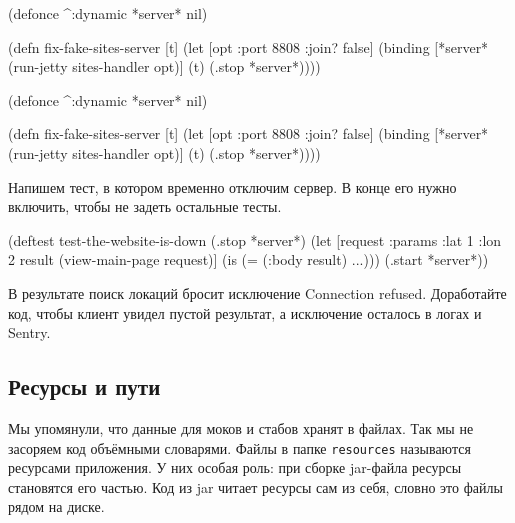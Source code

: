 
\ifnarrow

\begin{english}
  \begin{clojure}
(defonce ^:dynamic *server* nil)

(defn fix-fake-sites-server [t]
  (let [opt {:port 8808 :join? false}]
    (binding [*server*
              (run-jetty
                sites-handler opt)]
      (t)
      (.stop *server*))))
  \end{clojure}
\end{english}

\else

\begin{english}
  \begin{clojure}
(defonce ^:dynamic *server* nil)

(defn fix-fake-sites-server [t]
  (let [opt {:port 8808 :join? false}]
    (binding [*server*
              (run-jetty sites-handler opt)]
      (t)
      (.stop *server*))))
  \end{clojure}
\end{english}

\fi

Напишем тест, в котором временно отключим сервер. В конце его нужно включить,
чтобы не задеть остальные тесты.

\begin{english}
  \begin{clojure}
(deftest test-the-website-is-down
  (.stop *server*)
  (let [request {:params {:lat 1 :lon 2}}
        result (view-main-page request)]
    (is (= (:body result) {...})))
  (.start *server*))
  \end{clojure}
\end{english}

В результате поиск локаций бросит исключение Connection refused. Доработайте
код, чтобы клиент увидел пустой результат, а исключение осталось в логах и
Sentry.

\subsection{Ресурсы и пути}

\label{resources}


Мы упомянули, что данные для моков и стабов хранят в файлах. Так мы не засоряем
код объёмными словарями. Файлы в папке \verb|resources| называются ресурсами
приложения. У них особая роль: при сборке jar-файла ресурсы становятся его
частью. Код из jar читает ресурсы сам из себя, словно это файлы рядом на диске.

